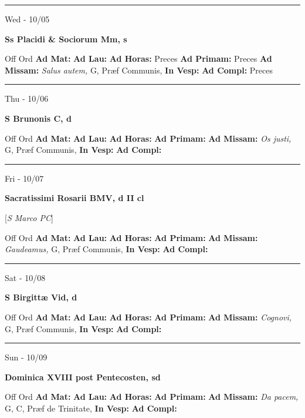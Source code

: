 \documentclass[letterpaper, 10pt]{article}
\begin{document}
\hrule
\begin{center}
Wed - 10/05
\end{center}\textbf{ \large Ss Placidi \& Sociorum Mm, \textnormal{\normalsize s}}
\begin{justify}
Off Ord
\textbf{Ad Mat: }
\textbf{Ad Lau: }
\textbf{Ad Horas: }Preces
\textbf{Ad Primam: }Preces
\textbf{Ad Missam:} \textit{Salus autem, } G, Præf Communis, 
\textbf{In Vesp: }
\textbf{Ad Compl: }Preces\end{justify}



\hrule
\begin{center}
Thu - 10/06
\end{center}\textbf{ \large S Brunonis C, \textnormal{\normalsize d}}
\begin{justify}
Off Ord
\textbf{Ad Mat: }
\textbf{Ad Lau: }
\textbf{Ad Horas: }
\textbf{Ad Primam: }
\textbf{Ad Missam:} \textit{Os justi, } G, Præf Communis, 
\textbf{In Vesp: }
\textbf{Ad Compl: }\end{justify}



\hrule
\begin{center}
Fri - 10/07
\end{center}\textbf{ \large Sacratissimi Rosarii BMV, \textnormal{\normalsize d II cl}}

[\textit{S Marco PC}]
\begin{justify}
Off Ord
\textbf{Ad Mat: }
\textbf{Ad Lau: }
\textbf{Ad Horas: }
\textbf{Ad Primam: }
\textbf{Ad Missam:} \textit{Gaudeamus, } G, Præf Communis, 
\textbf{In Vesp: }
\textbf{Ad Compl: }\end{justify}



\hrule
\begin{center}
Sat - 10/08
\end{center}\textbf{ \large S Birgittæ Vid, \textnormal{\normalsize d}}
\begin{justify}
Off Ord
\textbf{Ad Mat: }
\textbf{Ad Lau: }
\textbf{Ad Horas: }
\textbf{Ad Primam: }
\textbf{Ad Missam:} \textit{Cognovi, } G, Præf Communis, 
\textbf{In Vesp: }
\textbf{Ad Compl: }\end{justify}



\hrule
\begin{center}
Sun - 10/09
\end{center}\textbf{ \large Dominica XVIII post Pentecosten, \textnormal{\normalsize sd}}
\begin{justify}
Off Ord
\textbf{Ad Mat: }
\textbf{Ad Lau: }
\textbf{Ad Horas: }
\textbf{Ad Primam: }
\textbf{Ad Missam:} \textit{Da pacem, } G, C, Præf de Trinitate, 
\textbf{In Vesp: }
\textbf{Ad Compl: }\end{justify}
\end{document}
